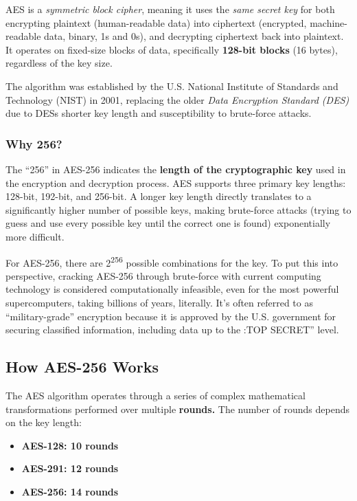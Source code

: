 AES is a \textit{symmetric block cipher}, meaning it uses the \textit{same secret key} for both encrypting plaintext (human-readable data) into ciphertext (encrypted, machine-readable data, binary, 1s and 0s), and decrypting ciphertext back into plaintext. It operates on fixed-size blocks of data, specifically \textbf{128-bit blocks} (16 bytes), regardless of the key size.

The algorithm was established by the U.S. National Institute of Standards and Technology (NIST) in 2001, replacing the older \textit{Data Encryption Standard (DES)} due to DESs shorter key length and susceptibility to brute-force attacks.

\subsubsection{\textbf{Why 256?}}

The “256” in AES-256 indicates the \textbf{length of the cryptographic key} used in the encryption and decryption process. AES supports three primary key lengths: 128-bit, 192-bit, and 256-bit. A longer key length directly translates to a significantly higher number of possible keys, making brute-force attacks (trying to guess and use every possible key until the correct one is found) exponentially more difficult.

For AES-256, there are 2\textsuperscript{256} possible combinations for the key. To put this into perspective, cracking AES-256 through brute-force with current computing technology is considered computationally infeasible, even for the most powerful supercomputers, taking billions of years, literally. It’s often referred to as “military-grade” encryption because it is approved by the U.S. government for securing classified information, including data up to the :TOP SECRET” level.

\subsection{\textbf{How AES-256 Works}}

The AES algorithm operates through a series of complex mathematical transformations performed over multiple \textbf{rounds. }The number of rounds depends on the key length:

\begin{itemize}
    \item \textbf{\textbf{AES-128: }10 rounds}
    \item \textbf{\textbf{AES-291: }12 rounds}
    \item \textbf{\textbf{AES-256: 14 rounds}}
\end{itemize}

